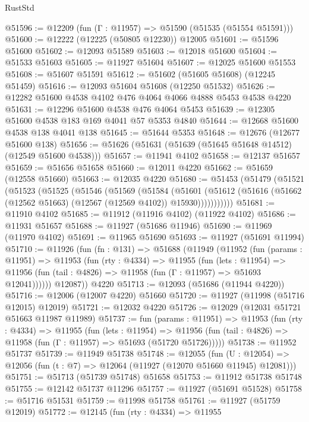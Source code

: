 \begin{lexlean}{RustStd}
\begin{coremodule}
@51596 := @12209 (fun (Γ : @11957) => @51590 (@51535 (@51554 @51591)))
@51600 := @12222 (@12225 (@50805 @12230)) @12005
@51601 := @51596 @51600
@51602 := @12093 @51589
@51603 := @12018 @51600
@51604 := @51533 @51603
@51605 := @11927 @51604
@51607 := @12025 @51600 @51553
@51608 := @51607 @51591
@51612 := @51602 (@51605 @51608) (@12245 @51459)
@51616 := @12093 @51604 @51608 (@12250 @51532)
@51626 := @12282 @51600 @4538 @4102 @476 @4064 @4066 @4888 @5453 @4538 @4220
@51631 := @12296 @51600 @4538 @476 @4064 @5453
@51639 := @12305 @51600 @4538 @183 @169 @4041 @57 @5353 @4840
@51644 := @12668 @51600 @4538 @138 @4041 @138
@51645 := @51644 @5353
@51648 := @12676 (@12677 @51600 @138)
@51656 := @51626 (@51631 (@51639 (@51645 @51648 @14512) (@12549 @51600 @4538)))
@51657 := @11941 @4102
@51658 := @12137 @51657
@51659 := @51656 @51658
@51660 := @12011 @4220
@51662 := @51659 (@12558 @51660)
@51663 := @12035 @4220
@51680 := @51453
    (@51479
      (@51521
        (@51523
          (@51525
            (@51546
              (@51569
                (@51584
                  (@51601
                    (@51612
                      (@51616 (@51662 (@12562 @51663) (@12567 (@12569 @4102)) @15930)))))))))))
@51681 := @11910 @4102
@51685 := @11912 (@11916 @4102) (@11922 @4102)
@51686 := @11931 @51657
@51688 := @11927 (@51686 @11946)
@51690 := @11969 (@11970 @4102)
@51691 := @11965 @51690
@51693 := @11927 (@51691 @11994)
@51710 := @11926
    (fun (fn : @131) =>
    @51688
      (@11949
        (@11952
          (fun (params : @11951) =>
          @11953
            (fun (rty : @4334) =>
            @11955
              (fun (lets : @11954) =>
              @11956 (fun (tail : @4826) => @11958 (fun (Γ : @11957) => @51693 @12041))))))
        @12087))
    @4220
@51713 := @12093 (@51686 (@11944 @4220))
@51716 := @12006 (@12007 @4220) @51660
@51720 := @11927 (@11998 (@51716 @12015) @12019)
@51721 := @12032 @4220
@51726 := @12029 (@12031 @51721 @51663 @11987 @11989)
@51737 := fun (params : @11951) =>
  @11953
    (fun (rty : @4334) =>
    @11955
      (fun (lets : @11954) =>
      @11956 (fun (tail : @4826) => @11958 (fun (Γ : @11957) => @51693 (@51720 @51726)))))
@51738 := @11952 @51737
@51739 := @11949 @51738
@51748 := @12055
    (fun (U : @12054) => @12056 (fun (t : @7) => @12064 (@11927 (@12070 @51660 @11945) @12081)))
@51751 := @51713 (@51739 @51748) @51658
@51753 := @11912 @51738 @51748
@51755 := @12142 @51737 @11296
@51757 := @11927 (@51691 @51528)
@51758 := @51716 @51531
@51759 := @11998 @51758
@51761 := @11927 (@51759 @12019)
@51772 := @12145
    (fun (rty : @4334) =>
    @11955

\end{coremodule}
\end{lexlean}
